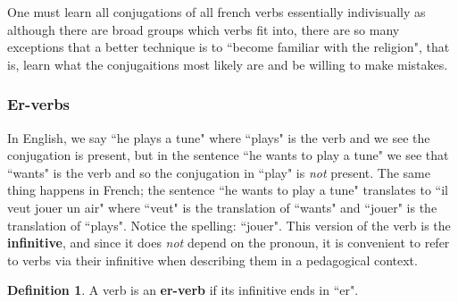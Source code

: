 \documentclass[12pt]{article}
\theoremstyle{plain}
\theoremstyle{definition}
\newtheorem{defn}[thm]{Definition} %
\begin{document}
	One must learn all conjugations of all french verbs essentially indivisually as although there are broad groups which verbs fit into, there are so many exceptions that a better technique is to ``become familiar with the religion", that is, learn what the conjugaitions most likely are and be willing to make mistakes.
	
	\subsubsection{Er-verbs}
	In English, we say ``he plays a tune" where ``plays" is the verb and we see the conjugation is present, but in the sentence ``he wants to play a tune" we see that ``wants" is the verb and so the conjugation in ``play" is \emph{not} present. The same thing happens in French; the sentence ``he wants to play a tune" translates to ``il veut jouer un air" where ``veut" is the translation of ``wants" and ``jouer" is the translation of ``plays". Notice the spelling: ``jouer". This version of the verb is the \textbf{infinitive}, and since it does \emph{not} depend on the pronoun, it is convenient to refer to verbs via their infinitive when describing them in a pedagogical context.
	
	\begin{defn}
		A verb is an \textbf{er-verb} if its infinitive ends in ``er".
		\end{defn}
	
\end{document}
